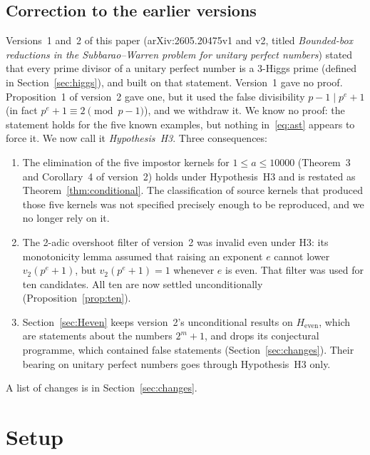 \documentclass[11pt]{amsart}
\theoremstyle{plain}
\theoremstyle{definition}
\begin{document}
\subsection*{Correction to the earlier versions}
Versions~1 and~2 of this paper (arXiv:2605.20475v1 and v2, titled
\emph{Bounded-box reductions in the Subbarao--Warren problem for unitary perfect
numbers}) stated that every prime divisor of a unitary perfect number is a
3-Higgs prime (defined in Section~\ref{sec:higgs}), and built on that
statement.  Version~1 gave no proof.  Proposition~1 of version~2 gave one, but
it used the false divisibility $p-1\mid p^e+1$ (in fact
$p^e+1\equiv 2\pmod{p-1}$), and we withdraw it.  We know no proof: the
statement holds for the five known examples, but nothing in~\eqref{eq:ast}
appears to force it.  We now call it \emph{Hypothesis~H3}.  Three
consequences:
\begin{enumerate}[label=(\arabic*),leftmargin=*]
\item The elimination of the five impostor kernels for $1\le a\le10000$
(Theorem~3 and Corollary~4 of version~2) holds under Hypothesis~H3 and is
restated as Theorem~\ref{thm:conditional}.  The classification of source
kernels that produced those five kernels was not specified precisely enough to
be reproduced, and we no longer rely on it.
\item The 2-adic overshoot filter of version~2 was invalid even under H3: its
monotonicity lemma assumed that raising an exponent $e$ cannot lower
$v_2(p^e+1)$, but $v_2(p^e+1)=1$ whenever $e$ is even.  That filter was used for
ten candidates.  All ten are now settled unconditionally
(Proposition~\ref{prop:ten}).
\item Section~\ref{sec:Heven} keeps version~2's unconditional results on
$H_{\mathrm{even}}$, which are statements about the numbers $2^m+1$, and drops
its conjectural programme, which contained false statements
(Section~\ref{sec:changes}).  Their bearing on unitary perfect numbers goes
through Hypothesis~H3 only.
\end{enumerate}
A list of changes is in Section~\ref{sec:changes}.

\section{Setup}\label{sec:setup}
\end{document}

